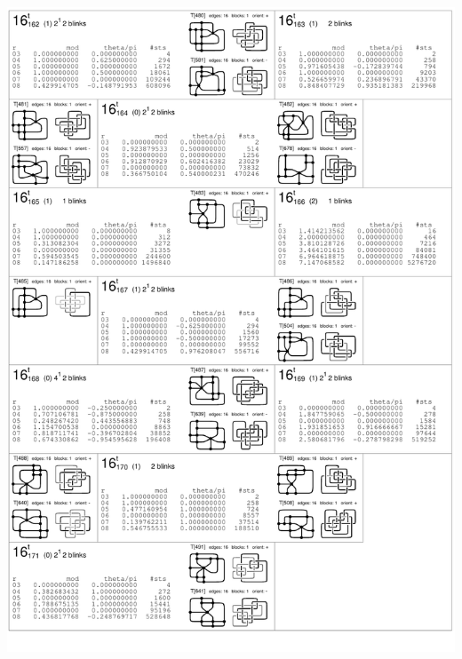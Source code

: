\begin{center}
 \includegraphics[height=23.5cm]{E.figsbw2/con3catalog031_bw.pdf} \eject

\end{center}
